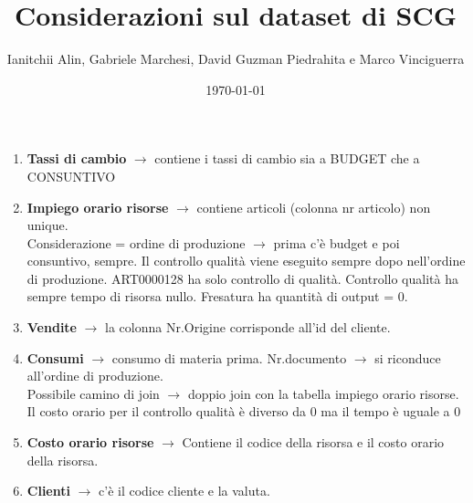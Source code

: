 \documentclass{article}
\title{Considerazioni sul dataset di SCG }
\author{Ianitchii Alin, Gabriele Marchesi, David Guzman Piedrahita e Marco Vinciguerra}
\date{\today}
\begin{document}
\maketitle
\begin{enumerate}
    \item \textbf{Tassi di cambio} $\rightarrow$ contiene i tassi di cambio sia a BUDGET che a CONSUNTIVO
    \item \textbf{Impiego orario risorse} $\rightarrow$ contiene articoli (colonna nr articolo) non unique. 
    \\Considerazione = ordine di produzione $\rightarrow$ prima c’è budget e poi consuntivo, sempre. Il controllo qualità viene eseguito sempre dopo nell’ordine di produzione. ART0000128 ha solo controllo di qualità.
    Controllo qualità ha sempre tempo di risorsa nullo. Fresatura ha quantità di output = 0.
    \item \textbf{Vendite} $\rightarrow$ la colonna Nr.Origine corrisponde all’id del cliente.
    \item \textbf{Consumi} $\rightarrow$ consumo di materia prima. Nr.documento $\rightarrow$ si riconduce all’ordine di produzione.
    \\Possibile camino di join $\rightarrow$ doppio join con la tabella impiego orario risorse.
    \\ Il costo orario per il controllo qualità è diverso da 0 ma il tempo è uguale a 0
    \item \textbf{Costo orario risorse} $\rightarrow$ Contiene il codice della risorsa e il costo orario della risorsa.
    \item \textbf{Clienti} $\rightarrow$ c’è il codice cliente e la valuta.
\end{enumerate}
\end{document}
